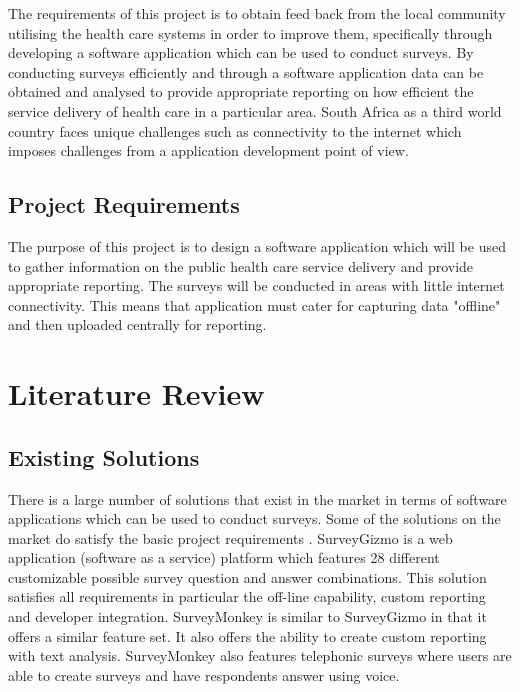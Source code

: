 \documentclass[12pt]{witseiepaper}
\begin{document}
The requirements of this project is to obtain feed back from the local community utilising the health care systems in order to improve them, specifically through developing a software application which can be used to conduct surveys. By conducting surveys efficiently and through a software application data can be obtained and analysed to provide appropriate reporting on how efficient the service delivery of health care in a particular area. South Africa as a third world country faces unique challenges such as connectivity to the internet \cite{Internet} which imposes challenges from a application development point of view. 

\subsection{Project Requirements}
The purpose of this project is to design a software application which will be used to gather information on the public health care service delivery and provide appropriate reporting. The surveys will be conducted in areas with little internet connectivity. This means that application must cater for capturing data "offline" and then uploaded centrally for reporting.

\section{Literature Review}
\subsection{Existing Solutions}
There is a large number of solutions that exist in the market in terms of software applications which can be used to conduct surveys. Some of the solutions on the market do satisfy the basic project requirements \cite{ReviewSurvey}. SurveyGizmo \cite{SurveyGizmo} is a web application (software as a service) platform which features 28 different customizable possible survey question and answer combinations. This solution satisfies all requirements in particular the off-line capability, custom reporting and developer integration. SurveyMonkey \cite{SurveyMonkey} is similar to SurveyGizmo in that it offers a similar feature set. It also offers the ability to create custom reporting with text analysis. SurveyMonkey also features telephonic surveys where users are able to create surveys and have respondents answer using voice. 

\end{document}
